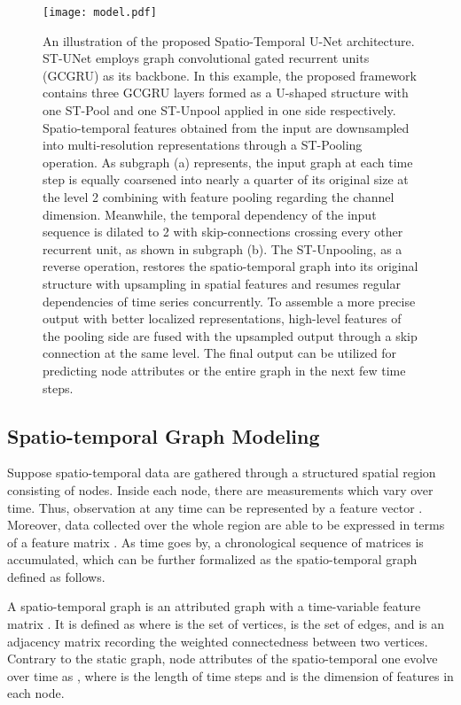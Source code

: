 \documentclass[sigconf,screen]{acmart}
\begin{document}
\begin{figure*}
  \centering
  \texttt{[image: model.pdf]}
  \caption{\label{fig:model}An illustration of the proposed Spatio-Temporal U-Net architecture. ST-UNet employs graph convolutional gated recurrent units (GCGRU) as its backbone. In this example, the proposed framework contains three GCGRU layers formed as a U-shaped structure with one ST-Pool and one ST-Unpool applied in one side respectively. Spatio-temporal features obtained from the input are downsampled into multi-resolution representations through a ST-Pooling operation. As subgraph (a) represents, the input graph at each time step is equally coarsened into nearly a quarter of its original size at the level 2 combining with feature pooling regarding the channel dimension. Meanwhile, the temporal dependency of the input sequence is dilated to 2 with skip-connections crossing every other recurrent unit, as shown in subgraph (b). The ST-Unpooling, as a reverse operation, restores the spatio-temporal graph into its original structure with upsampling in spatial features and resumes regular dependencies of time series concurrently. To assemble a more precise output with better localized representations, high-level features of the pooling side are fused with the upsampled output through a skip connection at the same level. The final output can be utilized for predicting node attributes or the entire graph in the next few time steps.}
\end{figure*}

\subsection{Spatio-temporal Graph Modeling}
Suppose spatio-temporal data are gathered through a structured spatial region consisting of  nodes. Inside each node, there are  measurements which vary over time. Thus, observation at any time can be represented by a feature vector . Moreover, data collected over the whole region are able to be expressed in terms of a feature matrix . As time goes by, a chronological sequence of matrices  is accumulated, which can be further formalized as the spatio-temporal graph defined as follows.

\begin{definition} 
A spatio-temporal graph is an attributed graph with a time-variable feature matrix . It is defined as  where  is the set of  vertices,  is the set of edges, and  is an adjacency matrix recording the weighted connectedness between two vertices. Contrary to the static graph, node attributes of the spatio-temporal one evolve over time as , where  is the length of time steps and  is the dimension of features in each node.
\end{definition}
\end{document}
